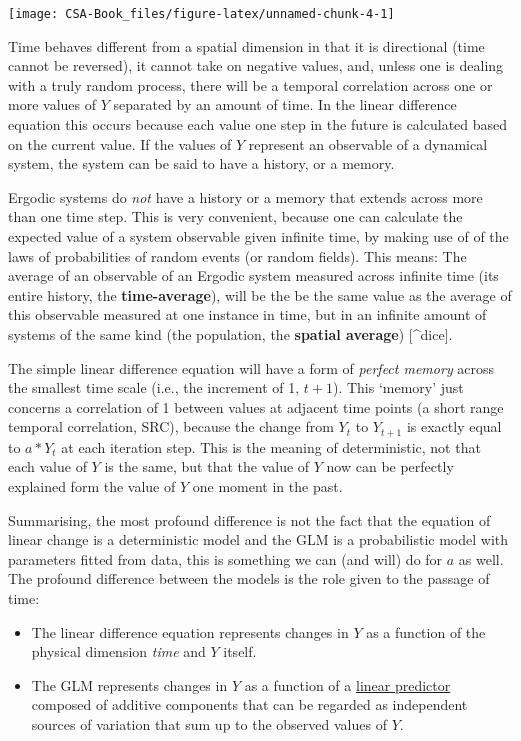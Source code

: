 \documentclass[12pt,]{book}
\providecommand{\tightlist}{%
  \setlength{\itemsep}{0pt}\setlength{\parskip}{0pt}}
\begin{document}
\begin{center}\texttt{[image: CSA-Book\_files/figure-latex/unnamed-chunk-4-1]} \end{center}

Time behaves different from a spatial dimension in that it is directional (time cannot be reversed), it cannot take on negative values, and, unless one is dealing with a truly random process, there will be a temporal correlation across one or more values of \(Y\) separated by an amount of time. In the linear difference equation this occurs because each value one step in the future is calculated based on the current value. If the values of \(Y\) represent an observable of a dynamical system, the system can be said to have a history, or a memory.

Ergodic systems do \emph{not} have a history or a memory that extends across more than one time step. This is very convenient, because one can calculate the expected value of a system observable given infinite time, by making use of of the laws of probabilities of random events (or random fields). This means: The average of an observable of an Ergodic system measured across infinite time (its entire history, the \textbf{time-average}), will be the be the same value as the average of this observable measured at one instance in time, but in an infinite amount of systems of the same kind (the population, the \textbf{spatial average}) {[}\^{}dice{]}.

The simple linear difference equation will have a form of \emph{perfect memory} across the smallest time scale (i.e., the increment of 1, \(t+1\)). This `memory' just concerns a correlation of 1 between values at adjacent time points (a short range temporal correlation, SRC), because the change from \(Y_t\) to \(Y_{t+1}\) is exactly equal to \(a * Y_t\) at each iteration step. This is the meaning of deterministic, not that each value of \(Y\) is the same, but that the value of \(Y\) now can be perfectly explained form the value of \(Y\) one moment in the past.

Summarising, the most profound difference is not the fact that the equation of linear change is a deterministic model and the GLM is a probabilistic model with parameters fitted from data, this is something we can (and will) do for \(a\) as well. The profound difference between the models is the role given to the passage of time:

\begin{itemize}
\tightlist
\item
  The linear difference equation represents changes in \(Y\) as a function of the physical dimension \emph{time} and \(Y\) itself.
\item
  The GLM represents changes in \(Y\) as a function of a \href{https://en.wikipedia.org/wiki/Linear_predictor_function}{linear predictor} composed of additive components that can be regarded as independent sources of variation that sum up to the observed values of \(Y\).
\end{itemize}
\end{document}
